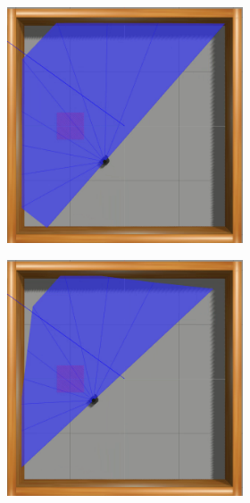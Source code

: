 \begin{figure}[H]
\begin{center}
\begin{subfigure}[b]{0.60\textwidth}
        \begin{subfigure}[b]{0.24\textwidth}
            \includegraphics[width=\textwidth]{imagens/simulated_envs/sim_env1_sac/5.png}
        \end{subfigure}
        \hfill
        \begin{subfigure}[b]{0.24\textwidth}
            \includegraphics[width=\textwidth]{imagens/simulated_envs/sim_env1_sac/6.png}

\end{subfigure}
\end{subfigure}
\end{center}
\end{figure}
